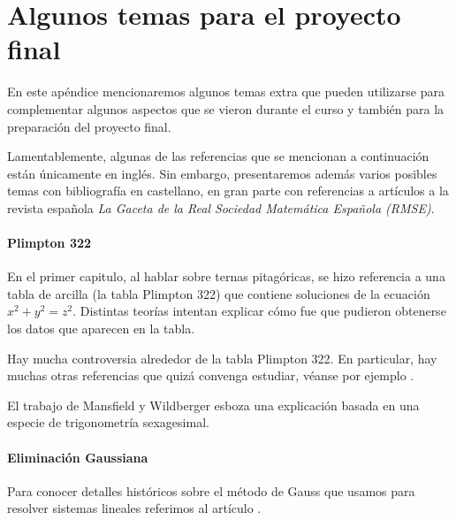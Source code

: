 \chapter{Algunos temas para el proyecto final}

\pagestyle{plain}
\fancyhf{}
\fancyfoot[CE,CO]{\leftmark}
\fancyfoot[LE,RO]{\thepage}


En este apéndice mencionaremos algunos temas extra 
que pueden utilizarse para complementar algunos aspectos que se
vieron durante el curso y también para la preparación
del proyecto final.  

Lamentablemente, algunas de las referencias
que se mencionan a continuación 
están únicamente en inglés. Sin embargo, presentaremos además
varios posibles temas con bibliografía en castellano, en gran parte
con referencias a artículos a la revista española \emph{La Gaceta de la Real
Sociedad Matemática Española (RMSE)}. 

\subsubsection*{Plimpton 322}

En el primer capitulo, al hablar sobre ternas pitagóricas, se hizo 
referencia a una tabla de arcilla (la tabla Plimpton 322) que contiene soluciones
de la ecuación $x^2+y^2=z^2$. Distintas teorías intentan explicar cómo
fue que pudieron obtenerse los datos que aparecen en la tabla. 

Hay mucha controversia alrededor de la tabla Plimpton 322. En particular, 
hay muchas otras referencias que quizá convenga estudiar, véanse por ejemplo 
\cite{MR1917126,MR631810,MR3074274,MR1849797,MR1903149,MR3955330}.

El trabajo
\cite{MR3716328} 
de Mansfield y Wildberger esboza una explicación basada en una especie 
de trigonometría sexagesimal. 

\subsubsection*{Eliminación Gaussiana}

Para conocer detalles históricos sobre 
el método de Gauss que usamos para resolver sistemas lineales
referimos al artículo \cite{MR2775854}. 


